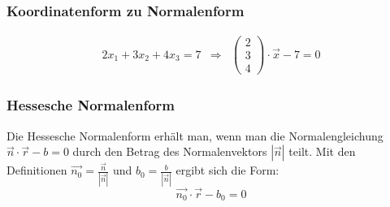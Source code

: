 \subsubsection{Koordinatenform zu Normalenform}
\[ 
\begin{array}{lll}
    2x_1 + 3x_2 + 4x_3 = 7 & \Rightarrow &
      \begin{pmatrix}
        2 \\ 3 \\ 4 
      \end{pmatrix} \cdot \vec{x} - 7 = 0
\end{array} 
\]

\subsubsection{Hessesche Normalenform}
Die Hessesche Normalenform erhält man, wenn man die Normalengleichung
$\vec{n} \cdot \vec{r} - b = 0$ durch den Betrag des Normalenvektors
$|\vec{n}|$ teilt. Mit den Definitionen $\vec{n_0} =
\frac{\vec{n}}{|\vec{n}|}$ und $b_0 = \frac{b}{|\vec{n}|}$ ergibt sich
die Form:
\[ \vec{n_0} \cdot \vec{r} - b_0 = 0 \]

